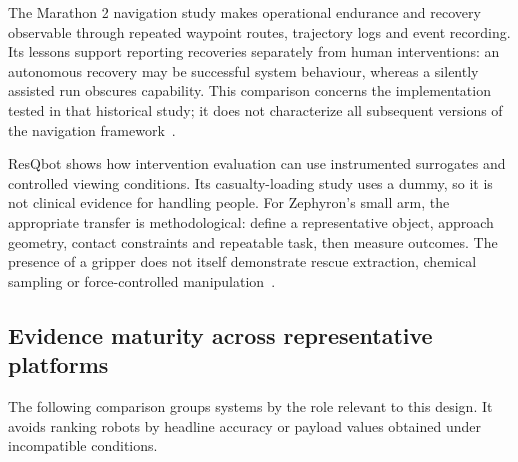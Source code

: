 \documentclass[11pt,letterpaper]{article}
\begin{document}
The Marathon 2 navigation study makes operational endurance and recovery observable through repeated waypoint routes, trajectory logs and event recording. Its lessons support reporting recoveries separately from human interventions: an autonomous recovery may be successful system behaviour, whereas a silently assisted run obscures capability. This comparison concerns the implementation tested in that historical study; it does not characterize all subsequent versions of the navigation framework~\cite{LIT_MARATHON2020}.

ResQbot shows how intervention evaluation can use instrumented surrogates and controlled viewing conditions. Its casualty-loading study uses a dummy, so it is not clinical evidence for handling people. For Zephyron's small arm, the appropriate transfer is methodological: define a representative object, approach geometry, contact constraints and repeatable task, then measure outcomes. The presence of a gripper does not itself demonstrate rescue extraction, chemical sampling or force-controlled manipulation~\cite{LIT_RESQBOT2019}.

\subsection{Evidence maturity across representative platforms}

The following comparison groups systems by the role relevant to this design. It avoids ranking robots by headline accuracy or payload values obtained under incompatible conditions.
\end{document}
